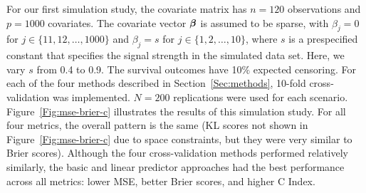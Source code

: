 For our first simulation study, the covariate matrix has $n = 120$ observations and $p = 1000$ covariates. The covariate vector $\boldsymbol{\beta}$ is assumed to be sparse, with $\beta_j = 0$ for $j \in \{11, 12, \ldots, 1000\}$ and $\beta_j = s$ for $j \in \{1, 2, \ldots, 10 \}$, where $s$ is a prespecified constant that specifies the signal strength in the simulated data set. Here, we vary $s$ from 0.4 to 0.9. The survival outcomes have 10$\%$ expected censoring. For each of the four methods described in Section~\ref{Sec:methods}, 10-fold cross-validation was implemented. $N = 200$ replications were used for each scenario.  Figure~\ref{Fig:mse-brier-c} illustrates the results of this simulation study. For all four metrics, the overall pattern is the same (KL scores not shown in Figure~\ref{Fig:mse-brier-c} due to space constraints, but they were very similar to Brier scores).  Although the four cross-validation methods performed relatively similarly, the basic and linear predictor approaches had the best performance across all metrics: lower MSE, better Brier scores, and higher C Index.

